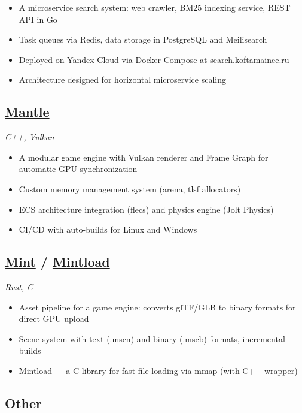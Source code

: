 \documentclass[a4paper,11pt]{article}
\begin{document}
\begin{itemize}
  \item A microservice search system: web crawler, BM25 indexing service, REST API in Go
  \item Task queues via Redis, data storage in PostgreSQL and Meilisearch
  \item Deployed on Yandex Cloud via Docker Compose at \href{https://search.koftamainee.ru}{search.koftamainee.ru}
  \item Architecture designed for horizontal microservice scaling
\end{itemize}

\subsection*{\href{https://github.com/koftamainee/mantle}{Mantle}}
\hfill \textit{C++, Vulkan}

\begin{itemize}
  \item A modular game engine with Vulkan renderer and Frame Graph for automatic GPU synchronization
  \item Custom memory management system (arena, tlsf allocators)
  \item ECS architecture integration (flecs) and physics engine (Jolt Physics)
  \item CI/CD with auto-builds for Linux and Windows
\end{itemize}

\subsection*{\href{https://github.com/koftamainee/mint}{Mint} / \href{https://github.com/koftamainee/mintload}{Mintload}}
\hfill \textit{Rust, C}

\begin{itemize}
  \item Asset pipeline for a game engine: converts glTF/GLB to binary formats for direct GPU upload
  \item Scene system with text (.mscn) and binary (.mscb) formats, incremental builds
  \item Mintload --- a C library for fast file loading via mmap (with C++ wrapper)
\end{itemize}

\subsection*{Other}
\end{document}
